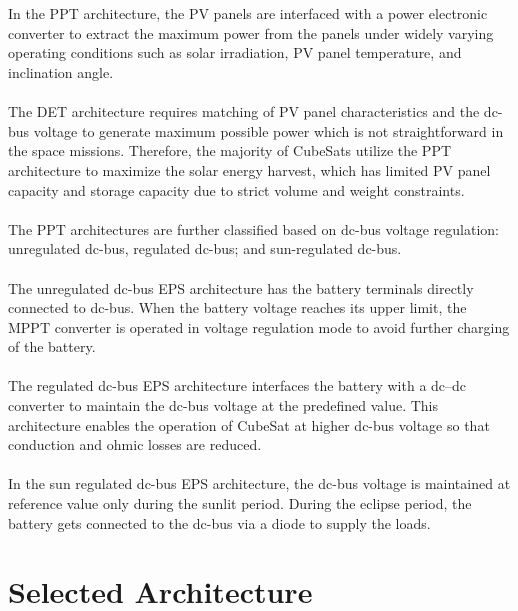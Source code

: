 \\ \\
 In the PPT architecture, the PV panels are interfaced with a power electronic converter to extract the maximum power from the panels under widely varying operating conditions such as solar irradiation, PV panel temperature, and inclination angle. 
 \\ \\
The DET architecture requires matching of PV panel characteristics and the dc-bus voltage to generate maximum possible power which is not straightforward in the space missions. Therefore, the majority of CubeSats utilize the PPT architecture to maximize the solar energy harvest, which has limited PV panel capacity and storage capacity due to strict volume and weight constraints. 
\\ \\
The PPT architectures are further classified based on dc-bus voltage regulation: unregulated dc-bus, regulated dc-bus; and sun-regulated dc-bus. 
\\ \\
The unregulated dc-bus EPS architecture has the battery terminals directly connected to dc-bus. When the battery voltage reaches its upper limit, the MPPT converter is operated in voltage regulation mode to avoid further charging of the battery. 
\\ \\
The regulated dc-bus EPS architecture interfaces the battery with a dc–dc converter to maintain the dc-bus voltage at the predefined value. This architecture enables the operation of CubeSat at higher dc-bus voltage so that conduction and ohmic losses are reduced. 
\\ \\
In the sun regulated dc-bus EPS architecture, the dc-bus voltage is maintained at reference value only during the sunlit period. During the eclipse period, the battery gets connected to the dc-bus via a diode to supply the loads.


\section[Selected Architecture]{Selected Architecture}

